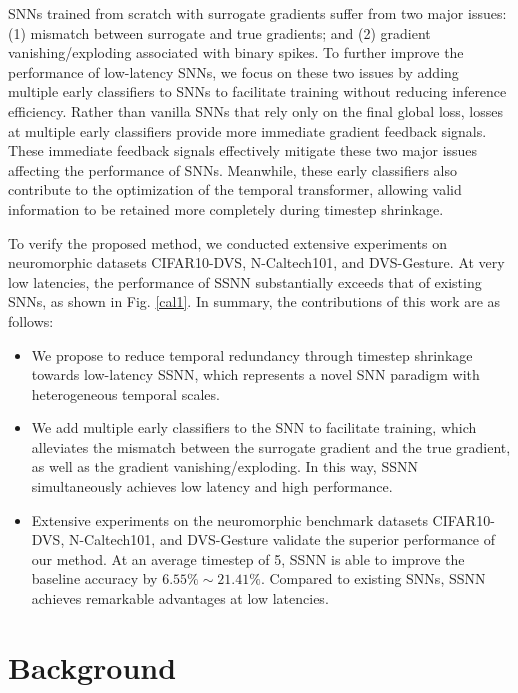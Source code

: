 \documentclass[letterpaper]{article} %
\begin{document}
SNNs trained from scratch with surrogate gradients suffer from two major issues: (1) mismatch between surrogate and true gradients; and (2) gradient vanishing/exploding associated with binary spikes. To further improve the performance of low-latency SNNs, we focus on these two issues by adding multiple early classifiers to SNNs to facilitate training without reducing inference efficiency. Rather than vanilla SNNs that rely only on the final global loss, losses at multiple early classifiers provide more immediate gradient feedback signals. These immediate feedback signals effectively mitigate these two major issues affecting the performance of SNNs. Meanwhile, these early classifiers also contribute to the optimization of the temporal transformer, allowing valid information to be retained more completely during timestep shrinkage.

To verify the proposed method, we conducted extensive experiments on neuromorphic datasets CIFAR10-DVS, N-Caltech101, and DVS-Gesture. At very low latencies, the performance of SSNN substantially exceeds that of existing SNNs, as shown in Fig. \ref{cal1}. In summary, the contributions of this work are as follows:
\begin{itemize}
\item We propose to reduce temporal redundancy through timestep shrinkage towards low-latency SSNN, which represents a novel SNN paradigm with heterogeneous temporal scales.
\item We add multiple early classifiers to the SNN to facilitate training, which alleviates the mismatch between the surrogate gradient and the true gradient, as well as the gradient vanishing/exploding. In this way, SSNN simultaneously achieves low latency and high performance.
\item Extensive experiments on the neuromorphic benchmark datasets CIFAR10-DVS, N-Caltech101, and DVS-Gesture validate the superior performance of our method. At an average timestep of 5, SSNN is able to improve the baseline accuracy by $6.55\%\sim21.41\%$. Compared to existing SNNs, SSNN achieves remarkable advantages at low latencies.
\end{itemize}


\section{Background}
\label{Background}
\end{document}
